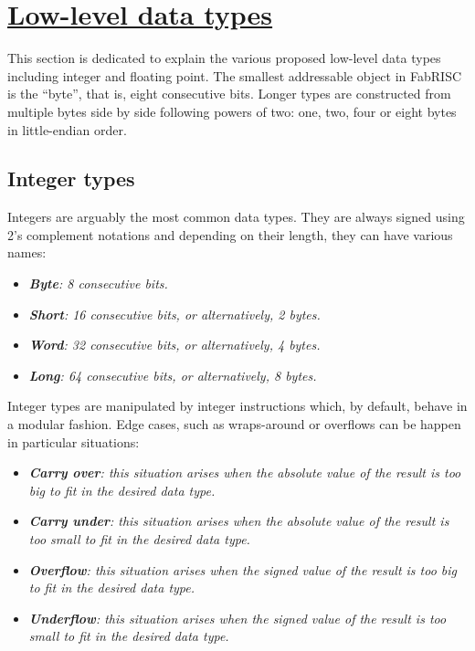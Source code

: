 \section[Low-level data types]{\LARGE\underline{Low-level data types}}

    \vspace{10pt}

    This section is dedicated to explain the various proposed low-level data types including integer and floating point. The smallest addressable object in FabRISC is the ``byte'', that is, eight consecutive bits. Longer types are constructed from multiple bytes side by side following powers of two: one, two, four or eight bytes in little-endian order.

    \subsection{Integer types}

        Integers are arguably the most common data types. They are always signed using 2's complement notations and depending on their length, they can have various names:

        \begin{itemize}

            \item \textit{\textbf{Byte}: 8 consecutive bits.}
            \item \textit{\textbf{Short}: 16 consecutive bits, or alternatively, 2 bytes.}
            \item \textit{\textbf{Word}: 32 consecutive bits, or alternatively, 4 bytes.}
            \item \textit{\textbf{Long}: 64 consecutive bits, or alternatively, 8 bytes.}

        \end{itemize}

        Integer types are manipulated by integer instructions which, by default, behave in a modular fashion. Edge cases, such as wraps-around or overflows can be happen in particular situations:

        \begin{itemize}

            \item \textit{\textbf{Carry over}: this situation arises when the absolute value of the result is too big to fit in the desired data type.}

            \item \textit{\textbf{Carry under}: this situation arises when the absolute value of the result is too small to fit in the desired data type.}

            \item \textit{\textbf{Overflow}: this situation arises when the signed value of the result is too big to fit in the desired data type.}

            \item \textit{\textbf{Underflow}: this situation arises when the signed value of the result is too small to fit in the desired data type.}

        \end{itemize}

